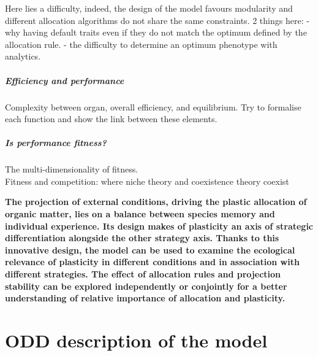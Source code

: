 Here lies a difficulty, indeed, the design of the model favours modularity and different allocation algorithms do not share the same constraints.
2 things here:
- why having default traits even if they do not match the optimum defined by the allocation rule.
- the difficulty to determine an optimum phenotype with analytics.

\paragraph{Efficiency and performance}
Complexity between organ, overall efficiency, and equilibrium. Try to formalise each function and show the link between these elements.

\paragraph{Is performance fitness?}

The multi-dimensionality of fitness.\\

Fitness and competition: where niche theory and coexistence theory coexist \cite{letten_linking_2017}

 
 
\textbf{The projection of external conditions, driving the plastic allocation of organic matter, lies on a balance between species memory and individual experience. Its design makes of plasticity an axis of strategic differentiation alongside the other strategy axis. Thanks to this innovative design, the model can be used to examine the ecological relevance of plasticity in different conditions and in association with different strategies. The effect of allocation rules and projection stability can be explored independently or conjointly for a better understanding of relative importance of allocation and plasticity.}




\chapter{ODD description of the model \model}\label{chapter:model-description}




